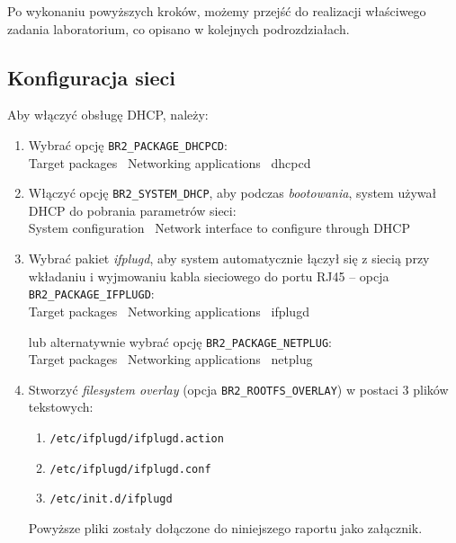 \documentclass{article}
\newenvironment{ttblock}{\ttfamily}{\par}
\begin{document}
Po wykonaniu powyższych kroków, możemy przejść do realizacji właściwego zadania laboratorium, co opisano w kolejnych podrozdziałach.


\subsection{Konfiguracja sieci}

Aby włączyć obsługę DHCP, należy:
\begin{enumerate}
\item Wybrać opcję \texttt{BR2\_PACKAGE\_DHCPCD}:\\
\begin{ttblock}
Target packages \textrightarrow\ Networking applications \textrightarrow\ dhcpcd
\end{ttblock}

\item Włączyć opcję \texttt{BR2\_SYSTEM\_DHCP}, aby podczas \emph{bootowania}, system używał DHCP do pobrania parametrów sieci:\\
\begin{ttblock}
System configuration \textrightarrow\ Network interface to configure through DHCP
\end{ttblock}

\item Wybrać pakiet \emph{ifplugd}, aby system automatycznie łączył się z siecią przy wkładaniu i wyjmowaniu kabla sieciowego do portu RJ45 -- opcja \texttt{BR2\_PACKAGE\_IFPLUGD}:\\
\begin{ttblock}
Target packages \textrightarrow\ Networking applications \textrightarrow\ ifplugd
\end{ttblock}
lub alternatywnie wybrać opcję \texttt{BR2\_PACKAGE\_NETPLUG}:\\
\begin{ttblock}
Target packages \textrightarrow\ Networking applications \textrightarrow\ netplug
\end{ttblock}

\item Stworzyć \emph{filesystem overlay} (opcja \texttt{BR2\_ROOTFS\_OVERLAY}) w postaci 3 plików tekstowych:
\begin{enumerate}
	\item \texttt{/etc/ifplugd/ifplugd.action}
	\item \texttt{/etc/ifplugd/ifplugd.conf}
	\item \texttt{/etc/init.d/ifplugd}
\end{enumerate}
Powyższe pliki zostały dołączone do niniejszego raportu jako załącznik.
\end{enumerate}
\end{document}

